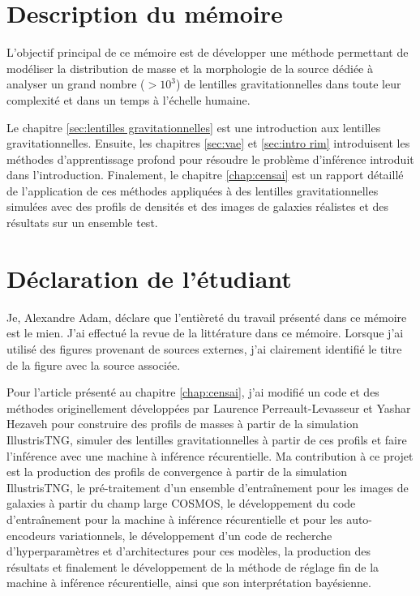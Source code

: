 \section{Description du mémoire}

L'objectif principal de ce mémoire est de développer une méthode permettant de 
modéliser la distribution de masse et 
la morphologie de la source dédiée à analyser un grand nombre ($> 10^{3}$)
de lentilles gravitationnelles dans toute leur complexité et dans un temps à l'échelle humaine. 

Le chapitre \ref{sec:lentilles gravitationnelles} est une introduction aux lentilles gravitationnelles. Ensuite, 
les chapitres \ref{sec:vae} et \ref{sec:intro rim} introduisent les méthodes d'apprentissage profond 
pour résoudre le problème d'inférence introduit dans l'introduction. 
Finalement, le chapitre \ref{chap:censai} est un rapport détaillé de l'application de ces méthodes 
appliquées à des lentilles gravitationnelles simulées 
avec des profils de densités et des images de galaxies réalistes 
et des résultats sur un ensemble test. 

\section{Déclaration de l'étudiant}
Je, Alexandre Adam, déclare que l'entièreté du travail présenté dans ce mémoire est le mien. J'ai effectué la revue de 
la littérature dans ce mémoire. Lorsque j'ai utilisé des figures provenant de sources externes, j'ai clairement 
identifié le titre de la figure avec la source associée.

Pour l'article présenté au chapitre \ref{chap:censai}, j'ai modifié un code et des méthodes originellement 
développées par Laurence Perreault-Levasseur et Yashar Hezaveh pour construire des profils de masses à partir 
de la simulation IllustrisTNG, simuler des lentilles gravitationnelles à partir de ces profils et faire l'inférence avec une 
machine à inférence récurentielle. Ma contribution à ce projet est la 
production des profils de convergence à partir de la simulation IllustrisTNG, le pré-traitement 
d'un ensemble d'entraînement pour les images de galaxies à partir du champ large COSMOS, le 
développement du code d'entraînement pour la machine à inférence récurentielle et pour les auto-encodeurs 
variationnels, le développement d'un code de recherche d'hyperparamètres et d'architectures pour ces modèles, 
la production des résultats et finalement 
le développement de la méthode de réglage fin de la machine à inférence récurentielle, 
ainsi que son interprétation bayésienne.

